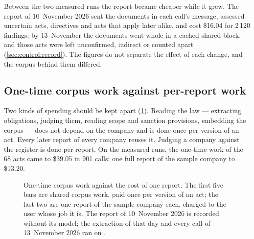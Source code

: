 Between the two measured runs the report became cheaper while it grew. The report of
10~November 2026 sent the documents in each call's message, assessed uncertain acts,
directives and acts that apply later alike, and cost \$16.04 for 2\,120 findings; by
13~November the documents went whole in a cached shared block, and those acts were left
unconfirmed, indirect or counted apart (\cref{sec:control:record}). The figures do not
separate the effect of each change, and the corpus behind them differed.

\subsection{One-time corpus work against per-report work}

Two kinds of spending should be kept apart (\cref{fig:control:split}). Reading the law ---
extracting obligations, judging them, reading scope and sanction provisions, embedding the
corpus --- does not depend on the company and is done once per version of an act. Every later
report of every company reuses it. Judging a company against the register is done per report.
On the measured runs, the one-time work of the 68 acts came to \$39.05 in 901 calls; one full
report of the sample company to \$13.20.

\begin{figure}[H]
\centering
{}
\caption{One-time corpus work against the cost of one report. The first five bars are shared
corpus work, paid once per version of an act; the last two are one report of the sample
company each, charged to the user whose job it is. The report of 10~November 2026 is recorded
without its model; the extraction of that day and every call of 13~November 2026 ran on
.}\label{fig:control:split}
\end{figure}

